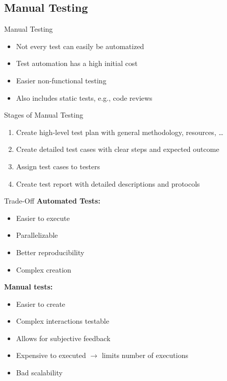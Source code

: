 \subsection{Manual Testing}
\begin{frame}{\insertsubsection}
	\begin{fancycolumns}[animation=none]
		\begin{definition}{Manual Testing}
			\begin{itemize}
				\item Not every test can easily be automatized
				\item Test automation has a high initial cost
				\item Easier non-functional testing
				\item Also includes static tests, e.g., code reviews
			\end{itemize}
		\end{definition}\pause
		\begin{note}{Stages of Manual Testing}
			\begin{enumerate}
				\item Create high-level test plan with general methodology, resources, \dots
				\item Create detailed test cases with clear steps and expected outcome
				\item Assign test cases to testers
				\item Create test report with detailed descriptions and protocols
			\end{enumerate}
		\end{note} \pause
		\nextcolumn
		\begin{note}{Trade-Off}
			\textbf{Automated Tests:}
			\begin{itemize}
				\item Easier to execute
				\item Parallelizable
				\item Better reproducibility
				\item Complex creation
			\end{itemize} \pause
			\textbf{Manual tests:}
			\begin{itemize}
				\item Easier to create
				\item Complex interactions testable
				\item Allows for subjective feedback
				\item Expensive to executed $\rightarrow$ limits number of executions
				\item Bad scalability 
			\end{itemize}
		\end{note}
		
	\end{fancycolumns}
\end{frame}

